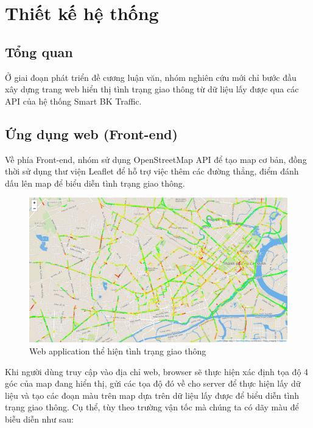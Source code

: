 
\chapter{Thiết kế hệ thống} %

\label{Chapter6}
\section{Tổng quan}
Ở giai đoạn phát triển đề cương luận văn, nhóm nghiên cứu mới chỉ bước đầu xây dựng trang web hiển thị tình trạng giao thông từ dữ liệu lấy được qua các API của hệ thống Smart BK Traffic.
\section{Ứng dụng web (Front-end)}
Về phía Front-end, nhóm sử dụng OpenStreetMap API để tạo map cơ bản, đồng thời sử dụng thư viện Leaflet để hỗ trợ việc thêm các đường thẳng, điểm đánh dấu lên map để biểu diễn tình trạng giao thông.

\begin{figure}[!ht]
	\begin{center}
		\includegraphics[width=1.0\textwidth]{Traffic_Report/images/map.png}
	\end{center}
	\caption{Web application thể hiện tình trạng giao thông}
\end{figure}

Khi người dùng truy cập vào địa chỉ web, browser sẽ thực hiện xác định tọa độ 4 góc của map đang hiển thị, gửi các tọa độ đó về cho server để thực hiện lấy dữ liệu và tạo các đoạn màu trên map dựa trên dữ liệu lấy được để biểu diễn tình trạng giao thông. Cụ thể, tùy theo trường vận tốc mà chúng ta có dãy màu để biễu diễn như sau:

